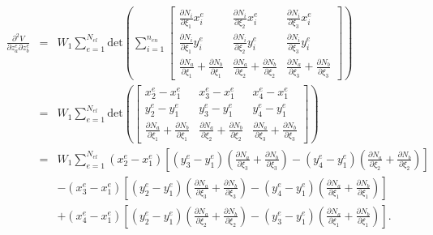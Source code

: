 \documentclass[12pt,aps,pre]{revtex4}
\begin{document}
\begin{eqnarray}
\frac{\partial^2 V}{\partial z_a^e \partial z_b^e} &=& W_1\sum_{e=1}^{N_{el}} \text{det}\left(\sum_{i=1}^{n_{en}} \begin{bmatrix}
\frac{\partial N_i}{\partial \xi_1}x_i^e  & \frac{\partial N_i}{\partial \xi_2}x_i^e  & \frac{\partial N_i}{\partial \xi_3}x_i^e \\
%
\frac{\partial N_i}{\partial \xi_1}y_i^e & \frac{\partial N_i}{\partial \xi_2}y_i^e & \frac{\partial N_i}{\partial \xi_3}y_i^e \\
%
\frac{\partial N_a}{\partial \xi_1}+\frac{\partial N_b}{\partial \xi_1}  & \frac{\partial N_a}{\partial \xi_2}+\frac{\partial N_b}{\partial \xi_2}  & \frac{\partial N_a}{\partial \xi_3}+\frac{\partial N_b}{\partial \xi_3} 
\end{bmatrix}\right) \nonumber\\
&=& W_1\sum_{e=1}^{N_{el}} \text{det}\left( \begin{bmatrix}
x_2^e - x_1^e & x_3^e - x_1^e & x_4^e - x_1^e \\
%
y_2^e - y_1^e & y_3^e - y_1^e & y_4^e - y_1^e \\
%
\frac{\partial N_a}{\partial \xi_1}+\frac{\partial N_b}{\partial \xi_1}  & \frac{\partial N_a}{\partial \xi_2}+\frac{\partial N_b}{\partial \xi_2}  & \frac{\partial N_a}{\partial \xi_3}+\frac{\partial N_b}{\partial \xi_3} 
\end{bmatrix}\right) \nonumber\\
%
&=&W_1\sum_{e=1}^{N_{el}}(x_2^e - x_1^e)\left[(y_3^e - y_1^e)\left(\frac{\partial N_a}{\partial \xi_3}+\frac{\partial N_b}{\partial \xi_3}\right)-(y_4^e - y_1^e)\left(\frac{\partial N_a}{\partial \xi_2}+\frac{\partial N_b}{\partial \xi_2}\right)\right] \nonumber\\
%
&&-(x_3^e - x_1^e)\left[(y_2^e - y_1^e)\left(\frac{\partial N_a}{\partial \xi_3}+\frac{\partial N_b}{\partial \xi_3}\right)-(y_4^e - y_1^e)\left(\frac{\partial N_a}{\partial \xi_1}+\frac{\partial N_b}{\partial \xi_1}\right)\right] \nonumber\\
%
&&+(x_4^e - x_1^e)\left[(y_2^e - y_1^e)\left(\frac{\partial N_a}{\partial \xi_2}+\frac{\partial N_b}{\partial \xi_2}\right)-(y_3^e - y_1^e)\left(\frac{\partial N_a}{\partial \xi_1}+\frac{\partial N_b}{\partial \xi_1}\right)\right].
\end{eqnarray}
\end{document}
